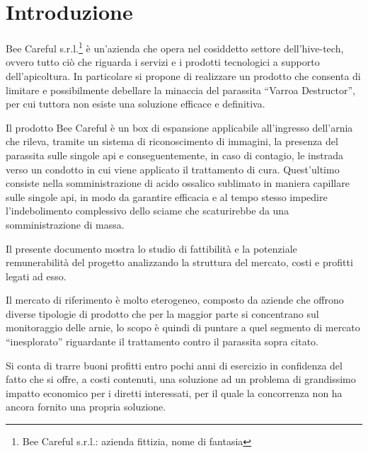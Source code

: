 \section{Introduzione}
Bee Careful s.r.l.\footnote{Bee Careful s.r.l.: azienda fittizia, nome di
fantasia} è un’azienda che opera nel cosiddetto settore dell’hive-tech, ovvero
tutto ciò che riguarda i servizi e i prodotti tecnologici a supporto
dell’apicoltura. In particolare si propone di realizzare un prodotto che
consenta di limitare e possibilmente debellare la minaccia del parassita “Varroa
Destructor”, per cui tuttora non esiste una soluzione efficace e definitiva.

Il prodotto Bee Careful è un box di espansione applicabile all’ingresso
dell’arnia che rileva, tramite un sistema di riconoscimento di immagini, la
presenza del parassita sulle singole api e conseguentemente, in caso di
contagio, le instrada verso un condotto in cui viene applicato il
trattamento di cura. Quest’ultimo consiste nella somministrazione di acido
ossalico sublimato in maniera capillare sulle singole api, in modo da garantire
efficacia e al tempo stesso impedire l’indebolimento complessivo dello sciame
che scaturirebbe da una somministrazione di massa.

Il presente documento mostra lo studio di fattibilità e la potenziale
remunerabilità del progetto analizzando la struttura del mercato, costi e
profitti legati ad esso.

Il mercato di riferimento è molto eterogeneo, composto da aziende che offrono
diverse tipologie di prodotto che per la maggior parte si concentrano sul
monitoraggio delle arnie, lo scopo è quindi di puntare a quel segmento di
mercato “inesplorato” riguardante il trattamento contro il parassita sopra
citato.

Si conta di trarre buoni profitti entro pochi anni di esercizio in confidenza
del fatto che si offre, a costi contenuti, una soluzione ad un problema di
grandissimo impatto economico per i diretti interessati, per il quale la
concorrenza non ha ancora fornito una propria soluzione.
